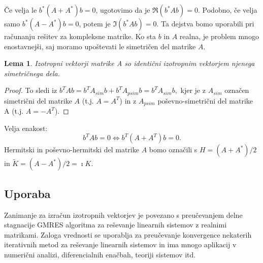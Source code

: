 \documentclass[12pt,a4paper]{amsart}
\theoremstyle{definition}
\theoremstyle{plain}
\newtheorem{lema}[definicija]{Lema}
\begin{document}
Če velja le $b^\ast (A+A^\ast)b=0$, ugotovimo da je $\Re(b^\ast Ab)=0$. Podobno, če velja samo $b^\ast(A-A^\ast)b=0$, potem je $\Im(b^\ast Ab)=0$. Ta dejstva bomo uporabili pri računanju rešitev za kompleksne matrike. 
Ko sta $b$ in $A$ realna, je problem mnogo enostavnejši, saj moramo upoštevati le simetričen del matrike $A$.
\begin{lema} \cite{lipkin}
Izotropni vektorji matrike A so identični izotropnim vektorjem njenega simetričnega dela.
\end{lema} 
\begin{proof}
To sledi iz $b^T Ab=b^T A_{sim} b +b^T A_{psim} b=b^T A_{sim} b,$ kjer je z $A_{sim}$ označen simetrični del matrike $A$ (t.j. $A=A^T$) in z $A_{psim}$ poševno-simetrični del matrike A (t.j. $A=-A^T$).
\end{proof}
Velja enakost:
$$b^T Ab=0 \Leftrightarrow b^T (A+A^T)b=0.$$ Hermitski in poševno-hermitski del matrike $A$ bomo označili s $H=(A+A^\ast)/2$ in $\tilde{K}=(A-A^\ast)/2=\imath K$.

\subsection{Uporaba}
Zanimanje za izračun izotropnih vektorjev je povezano s pre\-u\-če\-va\-njem delne stagnacije GMRES algoritma za reševanje linearnih sistemov z realnimi matrikami. Zaloga vrednosti se uporablja za preučevanje konvergence nekaterih iterativnih metod za reševanje linearnih sistemov in ima mnogo aplikacij v numerični analizi, diferencialnih enačbah, teoriji sistemov itd.

\end{document}
